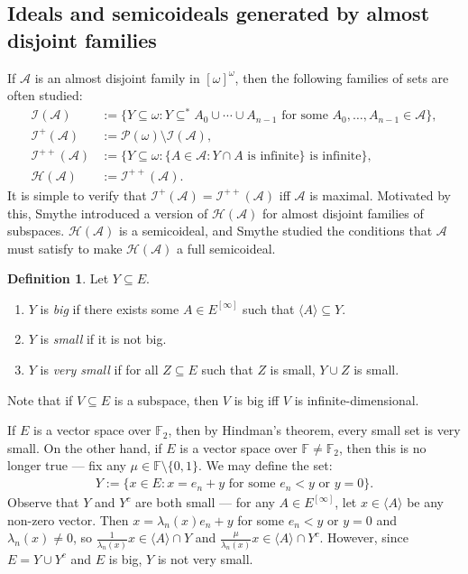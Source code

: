 \documentclass[10pt,a4paper]{amsart}
\theoremstyle{plain}
\numberwithin{equation}{section}
\theoremstyle{definition}
\newtheorem{definition}[theorem]{Definition}
\renewcommand{\c}[1]{\langle #1 \rangle}
\newcommand{\Po}{\cal{P}}
\newcommand{\cal}{\mathcal}
\newcommand{\A}{\cal{A}}
\renewcommand{\H}{\cal{H}}
\newcommand{\I}{\cal{I}}
\begin{document}
\subsection{Ideals and semicoideals generated by almost disjoint families}
If $\A$ is an almost disjoint family in $[\omega]^\omega$, then the following families of sets are often studied:
\begin{align*}
    \I(\A) &:= \{Y \subseteq \omega : Y \subseteq^* A_0 \cup \cdots \cup A_{n-1} \text{ for some $A_0,\dots,A_{n-1} \in \A$}\}, \\
    \I^+(\A) &:= \Po(\omega) \setminus \I(\A), \\
    \I^{++}(\A) &:= \{Y \subseteq \omega : \{A \in \A : Y \cap A \text{ is infinite}\} \text{ is infinite}\}, \\
    \H(\A) &:= \I^{++}(\A).
\end{align*}
It is simple to verify that $\I^+(\A) = \I^{++}(\A)$ iff $\A$ is maximal. Motivated by this, Smythe introduced a version of $\H(\A)$ for almost disjoint families of subspaces. $\H(\A)$ is a semicoideal, and Smythe studied the 
conditions that $\A$ must satisfy to make $\H(\A)$ a full semicoideal. 

\begin{definition}
    Let $Y \subseteq E$.
    \begin{enumerate}
        \item $Y$ is \emph{big} if there exists some $A \in E^{[\infty]}$ such that $\c{A} \subseteq Y$.
        
        \item $Y$ is \emph{small} if it is not big.
        
        \item $Y$ is \emph{very small} if for all $Z \subseteq E$ such that $Z$ is small, $Y \cup Z$ is small.
    \end{enumerate}
\end{definition}

Note that if $V \subseteq E$ is a subspace, then $V$ is big iff $V$ is infinite-dimensional.

If $E$ is a vector space over $\mathbb{F}_2$, then by Hindman's theorem, every small set is very small. On the other hand, if $E$ is a vector space over $\mathbb{F} \neq \mathbb{F}_2$, then this is no longer true --- fix any $\mu \in \mathbb{F} \setminus \{0,1\}$. We may define the set:
\begin{align*}
    Y := \{x \in E : x = e_n + y \text{ for some $e_n < y$ or $y = 0$}\}.
\end{align*}
Observe that $Y$ and $Y^c$ are both small --- for any $A \in E^{[\infty]}$, let $x \in \c{A}$ be any non-zero vector. Then $x = \lambda_n(x)e_n + y$ for some $e_n < y$ or $y = 0$ and $\lambda_n(x) \neq 0$, so $\frac{1}{\lambda_n(x)}x \in \c{A} \cap Y$ and $\frac{\mu}{\lambda_n(x)}x \in \c{A} \cap Y^c$. However, since $E = Y \cup Y^c$ and $E$ is big, $Y$ is not very small. 
\end{document}
